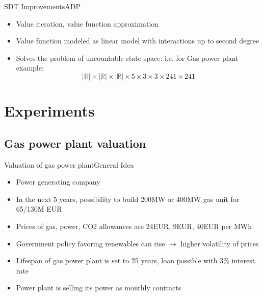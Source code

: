 \documentclass[us]{beamer}
\begin{document}
\begin{frame}{SDT Improvements}{ADP}
		\begin{itemize}
			\item{Value iteration, value function approximation}
			\item{Value function modeled as linear model with interactions up to second degree}
			\item{Solves the problem of uncountable state space: i.e. for Gas power plant example:}
			\begin{equation}
				|\mathbb{R}| \times |\mathbb{R}| \times |\mathbb{R}| \times 5\times 3 \times 3 \times 241 \times 241 
			\end{equation}
		\end{itemize}
\end{frame}

\section{Experiments}

\subsection{Gas power plant valuation}
	
	
	\begin{frame}{Valuation of gas power plant}{General Idea}
	\begin{itemize}
		\item {Power generating company}
		\item {In the next 5 years, possibility to build 200MW or 400MW gas unit for 65/130M EUR}
		\item {Prices of gas, power, CO2 allowances are 24EUR, 9EUR, 40EUR per MWh}
		\item {Government policy favoring renewables can rise $\rightarrow$ higher volatility of prices}
		\item {Lifespan of gas power plant is set to 25 years, loan possible with 3\% interest rate}
		\item {Power plant is selling its power as monthly contracts}		
	\end{itemize}
	\end{frame}
\end{document}
